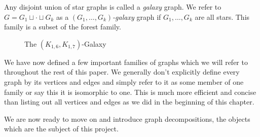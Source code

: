 \begin{definition}
    Any disjoint union of star graphs is called a \textit{galaxy} graph. We refer to $G=G_{1}\sqcup \cdot \sqcup G_{k}$ as a \textit{$(G_{1},\hdots,G_{k})$-galaxy} graph if $G_{1},\hdots,G_{k}$ are all stars. This family is a subset of the forest family.
\end{definition}

\begin{figure}[H]
    \begin{center}
    \end{center}
    \caption{The $(K_{1,6},K_{1,7})$-Galaxy}
    \label{fig:galaxy_close}
    \end{figure}
    
We have now defined a few important families of graphs which we will refer to throughout the rest of this paper. We generally don't explicitly define every graph by its vertices and edges and simply refer to it as some member of one family or say this it is isomorphic to one. This is much more efficient and concise than listing out all vertices and edges as we did in the beginning of this chapter.

We are now ready to move on and introduce graph decompositions, the objects which are the subject of this project.
  














